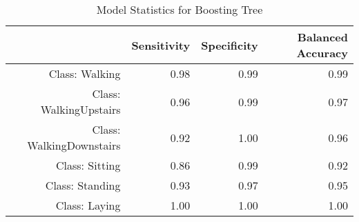 \begin{table}[ht]
\centering
\caption{Model Statistics for Boosting Tree} 
\label{tab:conmat_stats_boost}
\begin{tabular}{rrrr}
  \hline
 & Sensitivity & Specificity & Balanced Accuracy \\ 
  \hline
Class: Walking & 0.98 & 0.99 & 0.99 \\ 
  Class: WalkingUpstairs & 0.96 & 0.99 & 0.97 \\ 
  Class: WalkingDownstairs & 0.92 & 1.00 & 0.96 \\ 
  Class: Sitting & 0.86 & 0.99 & 0.92 \\ 
  Class: Standing & 0.93 & 0.97 & 0.95 \\ 
  Class: Laying & 1.00 & 1.00 & 1.00 \\ 
   \hline
\end{tabular}
\end{table}
